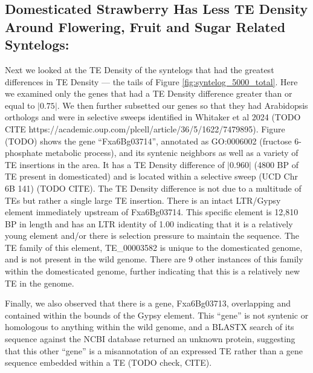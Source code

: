\documentclass[fleqn,10pt]{olplainarticle}
\begin{document}

\subsection{Domesticated Strawberry Has Less TE Density Around Flowering, Fruit and Sugar Related Syntelogs:}
Next we looked at the TE Density of the syntelogs that had the greatest differences in TE Density --- the tails of Figure \ref{fig:syntelog_5000_total}.
Here we examined only the genes that had a TE Density difference greater than or equal to $\lvert 0.75 \rvert$.
We then further subsetted our genes so that they had Arabidopsis orthologs and were in selective sweeps identified in Whitaker et al 2024 (TODO CITE https://academic.oup.com/plcell/article/36/5/1622/7479895).
Figure (TODO) shows the gene ``Fxa6Bg03714'', annotated as GO:0006002 (fructose 6-phosphate metabolic process), and its syntenic neighbors as well as a variety of TE insertions in the area.
It has a TE Density difference of $\lvert 0.960 \rvert$ (4800 BP of TE present in domesticated) and is located within a selective sweep (UCD Chr 6B 141) (TODO CITE).
The TE Density difference is not due to a multitude of TEs but rather a single large TE insertion.
There is an intact LTR/Gypsy element immediately upstream of Fxa6Bg03714.
This specific element is 12,810 BP in length and has an LTR identity of 1.00 indicating that it is a relatively young element and/or there is selection pressure to maintain the sequence.
The TE family of this element, TE\_00003582 is unique to the domesticated genome, and is not present in the wild genome.
There are 9 other instances of this family within the domesticated genome, further indicating that this is a relatively new TE in the genome.


Finally, we also observed that there is a gene, Fxa6Bg03713, overlapping and contained within the bounds of the Gypsy element.
This ``gene'' is not syntenic or homologous to anything within the wild genome, and a BLASTX search of its sequence against the NCBI database returned an unknown protein, suggesting that this other ``gene'' is a misannotation of an expressed TE rather than a gene sequence embedded within a TE (TODO check, CITE).
\end{document}
